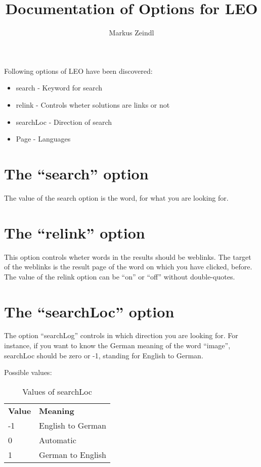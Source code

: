 \documentclass{article}
\title{Documentation of Options for LEO}
\author{Markus Zeindl}
\begin{document}
\maketitle
Following options of LEO have been discovered:
\begin{itemize}
\item{search - Keyword for search}
\item{relink - Controls wheter solutions are links or not}
\item{searchLoc - Direction of search}
\item{Page - Languages}
\end{itemize}

\section{The ``search'' option}

The value of the search option is the word, for what you are looking for.

\section{The ``relink'' option}

This option controls wheter words in the results should be weblinks. The target of the weblinks is the result page of the word on which you have clicked, before.\\
The value of the relink option can be ``on'' or ``off'' without double-quotes.

\section{The ``searchLoc'' option}

The option ``searchLog'' controls in which direction you are looking for. For instance, if you want to know the German meaning of the word ``image'', searchLoc should be zero or -1, standing for English to German.

Possible values:
\begin{table}
  \centering
  \begin{tabular}{|l|l|}

    \textbf{Value} & \textbf{Meaning}\\
   -1     & English to German\\
    0     & Automatic\\
    1     & German to English\\
  \end{tabular}
  \caption{Values of searchLoc}
\end{table}
\end{document}

